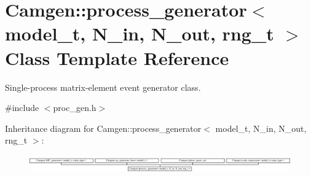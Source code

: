 \hypertarget{a00430}{\section{Camgen\-:\-:process\-\_\-generator$<$ model\-\_\-t, N\-\_\-in, N\-\_\-out, rng\-\_\-t $>$ Class Template Reference}
\label{a00430}
}


Single-\/process matrix-\/element event generator class.  




{\ttfamily \#include $<$proc\-\_\-gen.\-h$>$}

Inheritance diagram for Camgen\-:\-:process\-\_\-generator$<$ model\-\_\-t, N\-\_\-in, N\-\_\-out, rng\-\_\-t $>$\-:\begin{figure}[H]
\begin{center}
\leavevmode
\includegraphics[height=0.775623cm]{a00430}
\end{center}
\end{figure}

